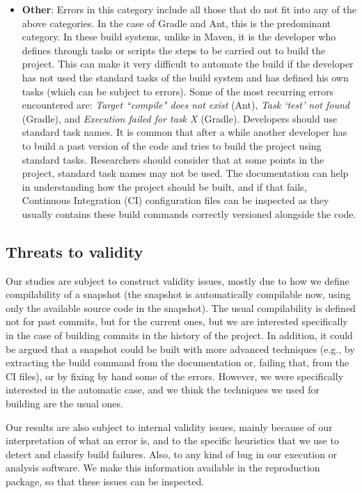 \begin{itemize}
    \item \textbf{Other}: Errors in this category include all those that do not fit into any of the above categories. 
    In the case of Gradle and Ant, this is the predominant category. 
    In these build systems, unlike in Maven, it is the developer who defines through tasks or scripts the steps to be carried out to build the project. 
    This can make it very difficult to automate the build if the developer has not used the standard tasks of the build system and has defined his own tasks (which can be subject to errors). Some of the most recurring errors encountered are: \emph{Target ``compile" does not exist} (Ant), \emph{Task `test' not found} (Gradle), and \emph{Execution failed for task X} (Gradle). 
    Developers should use standard task names. 
    It is common that after a while another developer has to build a past version of the code and tries to build the project using standard tasks. 
    Researchers should consider that at some points in the project, standard task names may not be used. 
    The documentation can help in understanding how the project should be built, and if that fails, Continuous Integration (CI) configuration files can be inspected as they usually contains these build commands correctly versioned alongside the code.
\end{itemize}


\subsection{Threats to validity}

Our studies are subject to construct validity issues, mostly due to how we define compilability of a snapshot (the snapshot is automatically compilable now, using only the available source code in the snapshot). The usual compilability is defined not for past commits, but for the current ones, but we are interested specifically in the case of building commits in the history of the project. In addition, it could be argued that a snapshot could be built with more advanced techniques (e.g., by extracting the build command from the documentation or, failing that, from the CI files), or by fixing by hand some of the errors. However, we were specifically interested in the automatic case, and we think the techniques we used for building are the usual ones.

Our results are also subject to internal validity issues, mainly because of our interpretation of what an error is, and to the specific heuristics that we use to detect and classify build failures. Also, to any kind of bug in our execution or analysis software. We make this information available in the reproduction package, so that these issues can be inspected.

